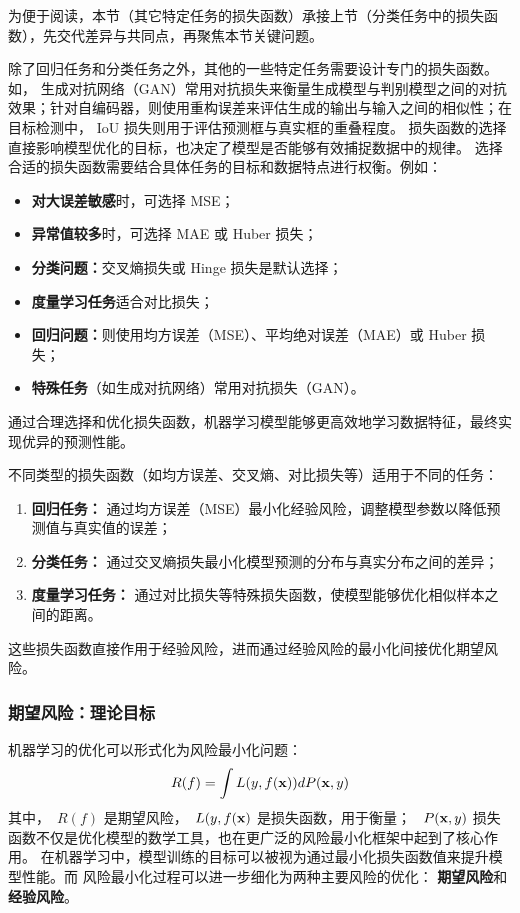 为便于阅读，本节（其它特定任务的损失函数）承接上节（分类任务中的损失函数），先交代差异与共同点，再聚焦本节关键问题。

除了回归任务和分类任务之外，其他的一些特定任务需要设计专门的损失函数。如，
生成对抗网络（GAN）常用对抗损失来衡量生成模型与判别模型之间的对抗效果；针对自编码器，则使用重构误差来评估生成的输出与输入之间的相似性；在目标检测中， IoU 损失则用于评估预测框与真实框的重叠程度。
损失函数的选择直接影响模型优化的目标，也决定了模型是否能够有效捕捉数据中的规律。
选择合适的损失函数需要结合具体任务的目标和数据特点进行权衡。例如：
\begin{itemize}
\item {\bf 对大误差敏感}时，可选择 MSE；
\item {\bf 异常值较多}时，可选择 MAE 或 Huber 损失；
\item {\bf 分类问题：}交叉熵损失或 Hinge 损失是默认选择；
\item {\bf 度量学习任务}适合对比损失；
\item {\bf 回归问题：}则使用均方误差（MSE）、平均绝对误差（MAE）或 Huber 损失；

\item {\bf 特殊任务}（如生成对抗网络）常用对抗损失（GAN）。
\end{itemize}
通过合理选择和优化损失函数，机器学习模型能够更高效地学习数据特征，最终实现优异的预测性能。

不同类型的损失函数（如均方误差、交叉熵、对比损失等）适用于不同的任务：
\begin{enumerate}
\item {\bf 回归任务：} 通过均方误差（MSE）最小化经验风险，调整模型参数以降低预测值与真实值的误差；
\item {\bf 分类任务： }通过交叉熵损失最小化模型预测的分布与真实分布之间的差异；
\item {\bf 度量学习任务：} 通过对比损失等特殊损失函数，使模型能够优化相似样本之间的距离。\end{enumerate}
这些损失函数直接作用于经验风险，进而通过经验风险的最小化间接优化期望风险。
\subsubsection{ 期望风险：理论目标}

机器学习的优化可以形式化为风险最小化问题：
$$
R(f) = \int L(y,f({\bf x})) dP({\bf x},y)
$$
其中，~$R(f)$ 是期望风险，~$L(y,f({\bf x})$ 是损失函数，用于衡量； ~$P({\bf x},y)$
损失函数不仅是优化模型的数学工具，也在更广泛的风险最小化框架中起到了核心作用。
在机器学习中，模型训练的目标可以被视为通过最小化损失函数值来提升模型性能。而
风险最小化过程可以进一步细化为两种主要风险的优化：
{\bf 期望风险}和{\bf 经验风险}。


